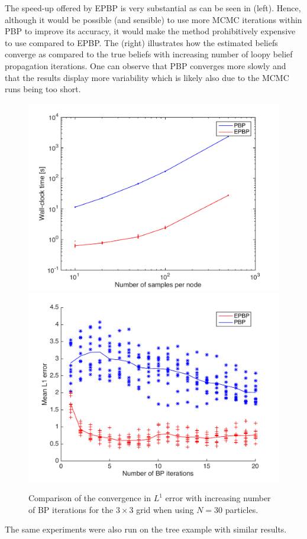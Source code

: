 The speed-up offered by EPBP is very substantial as can be seen in  (left). Hence, although it would be possible (and sensible) to use more MCMC iterations within PBP to improve its accuracy, it would make the method prohibitively expensive to use compared to EPBP. The  (right) illustrates how the estimated beliefs converge as compared to the true beliefs with increasing number of loopy belief propagation iterations. One can observe that PBP converges more slowly and that the results display more variability which is likely also due to the MCMC runs being too short. %

%
%
%
%
%

%
\begin{figure}[!h]
\center
\includegraphics[width=.51\textwidth]{figures/epbp/timeComparison}
\hspace*{-.7cm}
\includegraphics[width=.51\textwidth]{figures/epbp/compBPconv}
%
\caption{\label{compConv} Comparison of the convergence in $L^{1}$ error with increasing number of BP iterations for the $3\times 3$ grid when using $N=30$ particles. }%
\end{figure}
%
%
%
The same experiments were also run on the tree example with similar results.
